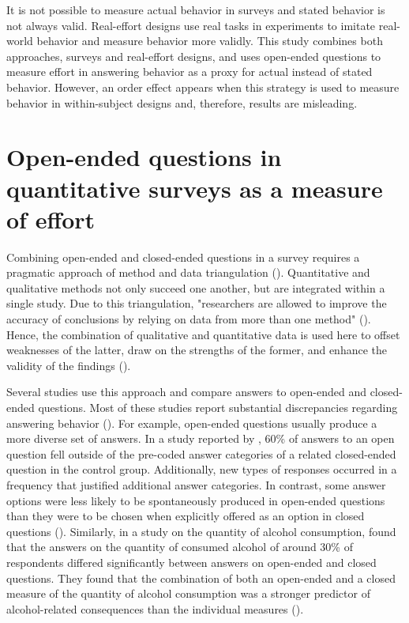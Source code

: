 \documentclass[twocolumn, issue, empirical, authordate]{jote-new-article}
\begin{document}
\begin{takeHomMessage}

It is not possible to measure actual behavior in surveys and stated behavior is not always valid. Real-effort designs use real tasks in experiments to imitate real-world behavior and measure behavior more validly. This study combines both approaches, surveys and real-effort designs, and uses open-ended questions to measure effort in answering behavior as a proxy for actual instead of stated behavior. However, an order effect appears when this strategy is used to measure behavior in within-subject designs and, therefore, results are misleading.

\end{takeHomMessage}



\section{Open-ended questions in quantitative surveys as a measure of effort}

Combining open-ended and closed-ended questions in a survey requires a pragmatic approach of method and data triangulation (). Quantitative and qualitative methods not only succeed one another, but are integrated within a single study. Due to this triangulation, "researchers are allowed to improve the accuracy of conclusions by relying on data from more than one method" (). Hence, the combination of qualitative and quantitative data is used here to offset weaknesses of the latter, draw on the strengths of the former, and enhance the validity of the findings ().

Several studies use this approach and compare answers to open-ended and closed-ended questions. Most of these studies report substantial discrepancies regarding answering behavior (). For example, open-ended questions usually produce a more diverse set of answers. In a study reported by \textcite{Schuman1979}, 60\% of answers to an open question fell outside of the pre-coded answer categories of a related closed-ended question in the control group. Additionally, new types of responses occurred in a frequency that justified additional answer categories. In contrast, some answer options were less likely to be spontaneously produced in open-ended questions than they were to be chosen when explicitly offered as an option in closed questions (). Similarly, in a study on the quantity of alcohol consumption, \textcite{Greenfield2006} found that the answers on the quantity of consumed alcohol of around 30\% of respondents differed significantly between answers on open-ended and closed questions. They found that the combination of both an open-ended and a closed measure of the quantity of alcohol consumption was a stronger predictor of alcohol-related consequences than the individual measures ().
\end{document}
